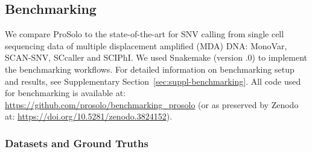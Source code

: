 \documentclass[12pt,inline]{wlscirep}
\begin{document}
\subsection{Benchmarking}

We compare ProSolo to the state-of-the-art for SNV calling from single cell sequencing data of multiple displacement amplified (MDA) DNA: MonoVar\cite{zafar_monovar:_2016}, SCAN-SNV\cite{luquette_identification_2019}, SCcaller\cite{dong_accurate_2017} and SCIPhI\cite{singer_single-cell_2018}. We used Snakemake\cite{koster_snakemakescalable_2012} (version {.0}) to implement the benchmarking workflows.
For detailed information on benchmarking setup and results, see Supplementary Section~\ref{sec:suppl-benchmarking}.
All code used for benchmarking is available at: \url{https://github.com/prosolo/benchmarking_prosolo} (or as preserved by Zenodo at: \url{https://doi.org/10.5281/zenodo.3824152}).

\subsubsection{Datasets and Ground Truths}
\end{document}
